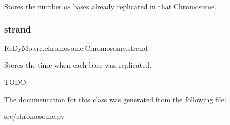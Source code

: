 Stores the number os bases already replicated in that \mbox{\hyperlink{classReDyMo_1_1src_1_1chromosome_1_1Chromosome}{Chromosome}}. 

\mbox{\label{classReDyMo_1_1src_1_1chromosome_1_1Chromosome_ad6b5e4f18b081ac4cf8271d1ec216141}} 
\subsubsection{\texorpdfstring{strand}{strand}}
{\footnotesize\ttfamily Re\+Dy\+Mo.\+src.\+chromosome.\+Chromosome.\+strand}



Stores the time when each base was replicated. 

T\+O\+DO\+: 

The documentation for this class was generated from the following file\+:\begin{DoxyCompactItemize}
\item 
src/chromosome.\+py\end{DoxyCompactItemize}
